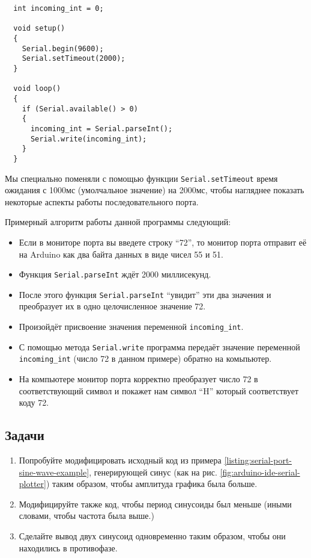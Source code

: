 \documentclass[../sparc.tex]{subfiles}
\begin{document}
\begin{verbatim}
  int incoming_int = 0;

  void setup()
  {
    Serial.begin(9600);
    Serial.setTimeout(2000);
  }

  void loop()
  {
    if (Serial.available() > 0)
    {
      incoming_int = Serial.parseInt();
      Serial.write(incoming_int);
    }
  }
\end{verbatim}

Мы специально поменяли с помощью функции \texttt{Serial.setTimeout} время
ожидания с 1000мс (умолчальное значение) на 2000мс, чтобы нагляднее показать
некоторые аспекты работы последовательного порта.

Примерный алгоритм работы данной программы следующий:
\begin{itemize}
  \item Если в мониторе порта вы введете строку
``72'', то монитор порта отправит её на Arduino как два байта данных в виде
чисел 55 и 51.
\item Функция \texttt{Serial.parseInt} ждёт 2000 миллисекунд.
\item После этого функция \texttt{Serial.parseInt} ``увидит'' эти два значения и
  преобразует их в одно целочисленное значение 72.
\item Произойдёт присвоение значения переменной \texttt{incoming\_int}.
\item С помощью метода \texttt{Serial.write} программа передаёт значение
  переменной \texttt{incoming\_int} (число 72 в данном примере) обратно на
  комьпьютер.
\item На компьютере монитор порта корректно преобразует число 72 в
  соответствующий символ и покажет нам символ ``H'' который соответствует коду
  72.
\end{itemize}

\subsection{Задачи}

\begin{enumerate}
\item Попробуйте модифицировать исходный код из примера
  \ref{listing:serial-port-sine-wave-example}, генерирующей синус (как на
  рис. \ref{fig:arduino-ide-serial-plotter}) таким образом, чтобы амплитуда
  графика была больше.
\item Модифицируйте также код, чтобы период синусоиды был меньше (иными словами,
  чтобы частота была выше.)
\item Сделайте вывод двух синусоид одновременно таким образом, чтобы они
  находились в противофазе.
\end{enumerate}
\end{document}
